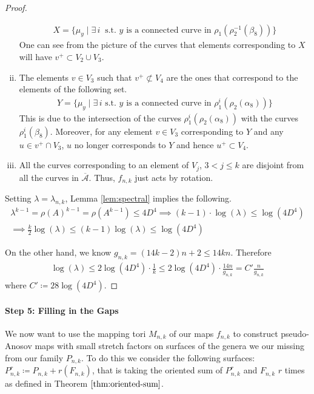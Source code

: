 \begin{proof}
\begin{enumerate}[(i)]
\begin{align*}
    X = \{\mu_y \mid \exists \,i\ \text{ s.t. $y$ is a connected curve in } \rho_1(\rho_2^{-1}(\beta_8))\}
  \end{align*}
  One can see from the picture of the curves that elements corresponding to $X$ will have
  $v^+ \subset V_2 \cup V_3$.
\item The elements $v \in V_3$ such that $v^+ \not\subset V_4$ are the ones that correspond to the elements of
  the following set.
  \begin{align*}
    Y = \{\mu_y \mid \exists \,i \text{ s.t. $y$ is a connected curve in } \rho_1^i(\rho_2(\alpha_8))\}
  \end{align*}
  This is due to the intersection of the curves $\rho_1^i(\rho_2(\alpha_8))$ with the curves
  $\rho_1^i(\beta_8)$. Moreover, for any element $v \in V_3$ corresponding to $Y$ and any
  $u \in v^+ \cap V_3$, $u$ no longer corresponds to $Y$ and hence $u^+ \subset V_4$.
\item All the curves corresponding to an element of $V_j$, $3 < j \leq k$ are disjoint from all the curves in
  $\overline{\mathcal{A}}$. Thus, $f_{n,k}$ just acts by rotation.
\end{enumerate}

Setting $\lambda = \lambda_{n,k}$, Lemma \ref{lem:spectral} implies the following.
\begin{gather*}
    \lambda^{k-1} = \rho(A)^{k-1} = \rho(A^{k-1}) \leq 4D^4 \implies (k-1)\cdot \log(\lambda) \leq \log(4D^4) \\
    \implies \frac{k}{2}\log(\lambda) \leq (k-1)\log(\lambda) \leq \log(4D^4)
\end{gather*}

On the other hand, we know $g_{n,k} = (14k - 2)n + 2 \leq 14kn$. Therefore
\begin{align*}
    \log(\lambda) \leq 2\log(4D^4)\cdot\frac{1}{k} \leq 2\log(4D^4)\cdot \frac{14n}{g_{n,k}} = C'\frac{n}{g_{n,k}}
\end{align*}
where $C' \coloneqq 28\log(4D^4)$.
\end{proof}

\paragraph{Step 5: Filling in the Gaps}

We now want to use the mapping tori $M_{n,k}$ of our maps $f_{n,k}$ to construct pseudo-Anosov maps with small
stretch factors on surfaces of the genera we our missing from our family $P_{n,k}$. To do this we consider
the following surfaces: $P^r_{n,k} \coloneqq P_{n,k} + r(F_{n,k})$, that is taking the oriented sum of $P^r_{n,k}$ and
$F_{n,k}$ $r$ times as defined in Theorem $\ref{thm:oriented-sum}$.

